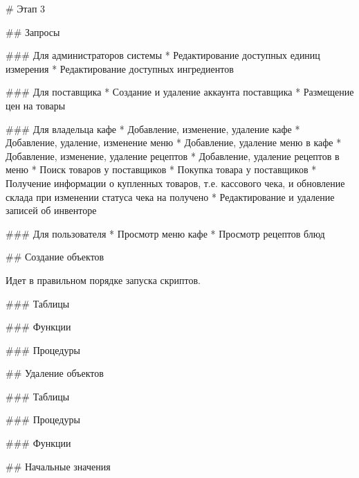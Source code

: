 \begin{markdown}
# Этап 3

## Запросы

### Для администраторов системы
* Редактирование доступных единиц измерения
* Редактирование доступных ингредиентов

### Для поставщика
* Создание и удаление аккаунта поставщика
* Размещение цен на товары

### Для владельца кафе
* Добавление, изменение, удаление кафе 
* Добавление, удаление, изменение меню
* Добавление, удаление меню в кафе
* Добавление, изменение, удаление рецептов
* Добавление, удаление рецептов в меню
* Поиск товаров у поставщиков
* Покупка товара у поставщиков
* Получение информации о купленных товаров, т.е. кассового чека, и обновление склада при изменении статуса чека на получено
* Редактирование и удаление записей об инвенторе

### Для пользователя
* Просмотр меню кафе
* Просмотр рецептов блюд

## Создание объектов

Идет в правильном порядке запуска скриптов.

### Таблицы
\end{markdown}


\begin{markdown}
### Функции
\end{markdown}


\begin{markdown}
### Процедуры
\end{markdown}


\begin{markdown}
## Удаление объектов

### Таблицы
\end{markdown}


\begin{markdown}
### Процедуры
\end{markdown}


\begin{markdown}
### Функции
\end{markdown}


\begin{markdown}
## Начальные значения
\end{markdown}




